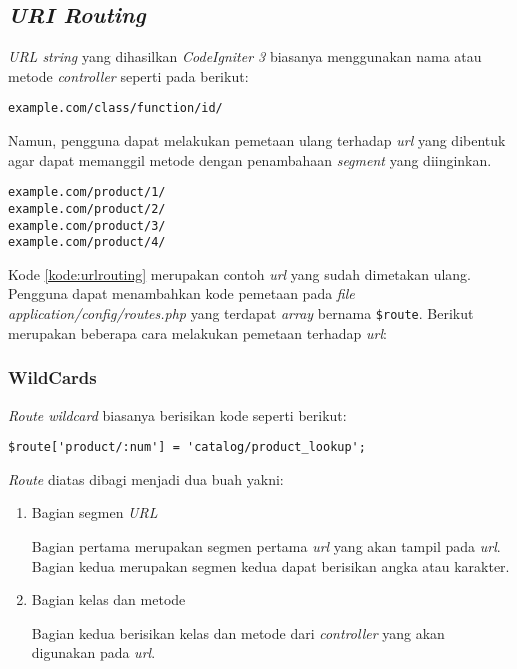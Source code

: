 \subsection{\textit{URI Routing}}
\textit{URL string} yang dihasilkan \textit{CodeIgniter 3} biasanya menggunakan nama atau metode \textit{controller} seperti pada berikut:

\begin{center}
\verb|example.com/class/function/id/|
\end{center}

Namun, pengguna dapat melakukan pemetaan ulang terhadap \textit{url} yang dibentuk agar dapat memanggil metode dengan penambahaan \textit{segment} yang diinginkan.

\begin{lstlisting}[caption=Contoh \textit{url} yang sudah dimetakan,label=kode:urlrouting]
example.com/product/1/
example.com/product/2/
example.com/product/3/
example.com/product/4/
\end{lstlisting}

Kode \ref{kode:urlrouting} merupakan contoh \textit{url} yang sudah dimetakan ulang. Pengguna dapat menambahkan kode pemetaan pada \textit{file application/config/routes.php} yang terdapat \textit{array} bernama \verb|$route|. Berikut merupakan beberapa cara melakukan pemetaan terhadap \textit{url}:

\subsubsection{WildCards}

\textit{Route wildcard} biasanya berisikan kode seperti berikut:

\begin{center}
\verb|$route['product/:num'] = 'catalog/product_lookup';|
\end{center}

\textit{Route} diatas dibagi menjadi dua buah yakni:
\begin{enumerate}
\item Bagian segmen \textit{URL}

Bagian pertama merupakan segmen pertama \textit{url} yang akan tampil pada \textit{url}. Bagian kedua merupakan segmen kedua dapat berisikan angka atau karakter.

\item Bagian kelas dan metode

Bagian kedua berisikan kelas dan metode dari \textit{controller} yang akan digunakan pada \textit{url}.

\end{enumerate} 

